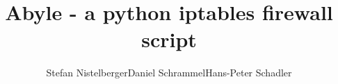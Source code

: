 \documentclass[12pt,oneside,a4paper,pointednumbers]{scrbook}
\begin{document}
\title{Abyle - a python iptables firewall script}
\author{Stefan Nistelberger\cr Daniel Schrammel\cr Hans-Peter Schadler}


\maketitle

\tableofcontents




\end{document}
